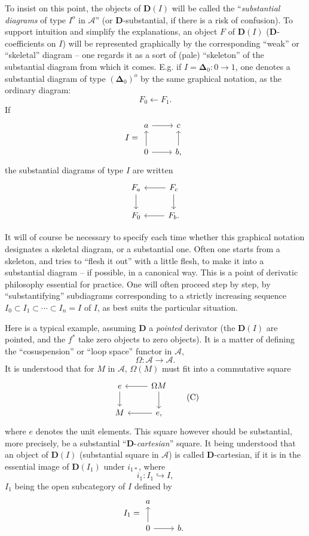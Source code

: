 \documentclass[11pt]{article}
\newcommand{\printedpage}[1]{\marginpar{\footnotesize p.~#1}}
\newcommand{\msp}[1]{\marginpar{\footnotesize [#1]}}
\newcommand{\D}{\mathbf{D}}
\newcommand{\cA}{\mathcal{A}}
\newcommand{\bDelta}{\boldsymbol{\Delta}}
\begin{document}
To insist on this point, the objects of $\D(I)$ will be called the ``\textit{substantial diagrams} of type $I^o$ in $\cA$'' (or $\D$-substantial, if there is a risk of confusion). To support intuition and simplify the explanations, an object $F$ of $\D(I)$ ($\D$-coefficients on $I$) will be represented graphically by the corresponding ``weak'' or ``skeletal'' diagram -- one regards it
\msp{page 74}
as a sort of (pale) ``skeleton'' of the substantial diagram from which it comes. E.g. if $I=\bDelta_0 : 0\longrightarrow 1$, one denotes a substantial diagram of type $(\bDelta_0)^o$ by the same graphical notation, as the ordinary diagram:
\[
F_0 \longleftarrow F_1.
\]
If
\[
I = \begin{tikzcd}
a \arrow[r] & c \\
0 \arrow[u] \arrow[r] & b, \arrow[u]
\end{tikzcd}
\]
the substantial diagrams of type $I$ are written
\[
\begin{tikzcd}
F_a \arrow[d] & F_c \arrow[l] \arrow[d] \\
F_0 & F_b. \arrow[l]
\end{tikzcd}
\]

\clearpage

\printedpage{2}

It will of course be necessary to specify each time whether this graphical notation designates a skeletal diagram, or a substantial one. Often one starts from a skeleton, and tries to ``flesh it out'' with a little flesh, to make it into a substantial diagram -- if possible, in a canonical way. This is a point of derivatic philosophy essential for practice. One will often proceed step by step, by ``substantifying'' subdiagrams corresponding to a strictly increasing sequence $I_0\subset I_1\subset\cdots\subset I_n=I$ of $I$, as best suits the particular situation.

\msp{page 75}

Here is a typical example, assuming $\D$ a \textit{pointed} derivator (the $\D(I)$ are pointed, and the $f^*$ take zero objects to zero objects). It is a matter of defining the ``cosuspension'' or ``loop space'' functor in $\cA$,
\[
\Omega : \cA \longrightarrow \cA.
\]
It is understood that for $M$ in $\cA$, $\Omega(M)$ must fit into a commutative square
\[
\begin{tikzcd}
e \arrow[d] & \Omega M \arrow[l] \arrow[d] \\
M & e, \arrow[l]
\end{tikzcd}
\tag*{(C)}
\]
where $e$ denotes the unit elements. This square however should be substantial, more precisely, be a substantial ``$\D$-\textit{cartesian}'' square. It being understood that an object of $\D(I)$ (substantial square in $\cA$) is called $\D$-cartesian, if it is in the essential image of $\D(I_1)$ under $i_{1*}$, where
\[
i_1 : I_1 \hookrightarrow I,
\]
$I_1$ being the open subcategory of $I$ defined by
\[
I_1 = \begin{tikzcd}
a \\
0 \arrow[u] \arrow[r] & b.
\end{tikzcd}
\]
\end{document}
